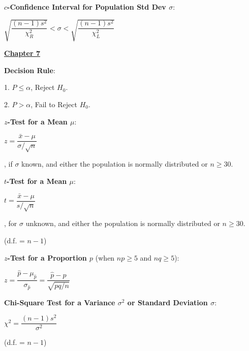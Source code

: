 \documentclass{article}
\begin{document}
\begin{large}
\textbf{$c$-Confidence Interval for Population Std Dev $\sigma$}:

\hspace{0.1in} \begin{Large}$\sqrt{\dfrac{(n-1)s^{2}}{\chi_{R}^{2}}} < \sigma < \sqrt{\dfrac{(n-1)s^{2}}{\chi_{L}^{2}}}$\end{Large}

\vspace{0.25in}

\underline{\textbf{\huge Chapter 7 \phantom{ } \phantom{ } \phantom{ } \phantom{ }}}

\textbf{Decision Rule}:

\hspace{0.1in} 1. $P \leq \alpha$, Reject $H_{0}$.

\hspace{0.1in} 2. $P > \alpha$, Fail to Reject $H_{0}$.

\textbf{$z$-Test for a Mean $\mu$}: 

\hspace{0.1in} \begin{Large}$z = \dfrac{\bar{x} - \mu}{\sigma / \sqrt{n}}$\end{Large}, if $\sigma$ known, and either the population is normally distributed or $n \geq 30$.

\vspace{0.5in}
\textbf{$t$-Test for a Mean $\mu$}: 

\hspace{0.1in} \begin{Large}$t = \dfrac{\bar{x} - \mu}{s / \sqrt{n}}$\end{Large}, for $\sigma$ unknown, and either the population is normally distributed or $n \geq 30$. 

\hspace{0.2in} (d.f. = $n - 1$)

\textbf{$z$-Test for a Proportion $p$} (when $np \geq 5$ and $nq \geq 5$):

\hspace{0.1in}  \begin{Large}$z = \dfrac{\hat{p} - \mu_{\hat{p}}}{\sigma_{\hat{p}}} = \dfrac{\hat{p} - p}{\sqrt{pq/n}}$\end{Large}

\textbf{Chi-Square Test for a Variance $\sigma^{2}$ or Standard Deviation $\sigma$}:

\hspace{0.1in} \begin{Large}$\chi^{2} = \dfrac{(n-1)s^{2}}{\sigma^{2}}$\end{Large} (d.f. = $n-1$)


\end{large}
\end{document}
